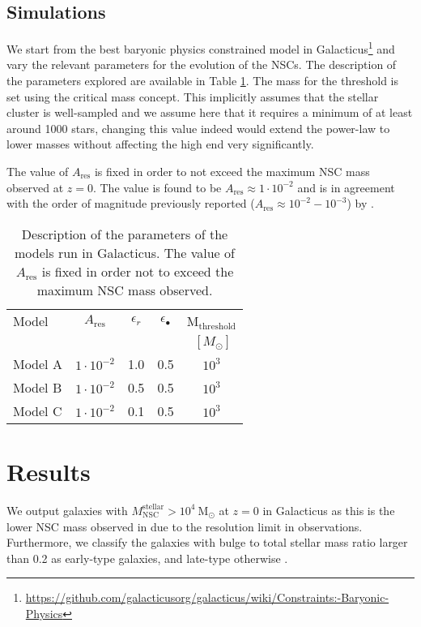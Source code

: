 \documentclass[baaa]{baaa}
\begin{document}
\subsection{Simulations}

We start from the best baryonic physics constrained model in {\sc Galacticus}\footnote{\url{https://github.com/galacticusorg/galacticus/wiki/Constraints:-Baryonic-Physics}} and vary the relevant parameters for the evolution of the NSCs. The description of the parameters explored are available in Table \ref{tabla1}. The mass for the threshold is set using the critical mass concept. This implicitly assumes that the stellar cluster is well-sampled and we assume here that it requires a minimum of at least around 1000 stars, changing this value indeed would extend the power-law to lower masses without affecting the high end very significantly.

The value of $A_\mathrm{res}$ is fixed in order to not exceed the maximum NSC mass observed at $z=0$. The value is found to be $A_\mathrm{res}\approx 1\cdot 10^{-2}$  and is in agreement with the order of magnitude previously reported ($A_\mathrm{res}\approx 10^{-2}-10^{-3}$) by \cite{ANTONINI2015}.


\begin{table}[!t]
\centering
\caption{Description of the parameters of the models run in {\sc Galacticus}. The value of $A_\mathrm{res}$ is fixed in order not to exceed the maximum NSC mass observed. }
\begin{tabular}{lcccc}
\hline\hline\noalign{\smallskip}
\!\!Model & \!\!\!\!$A_\mathrm{res}$ & \!\!\!\! $\epsilon_r$ & \!\!\!\! $\epsilon_\bullet$\!\!\!\! &\!\!\!\!  M$_\mathrm{threshold}$ \\
& & & & $~[M_\odot]$\\
\hline\noalign{\smallskip}
\!\!Model A  & $1\cdot 10^{-2}$ & 1.0 & 0.5& $10^{3}$\\
\!\!Model B & $1\cdot 10^{-2}$  &  0.5& 0.5&$10^{3}$\\
\!\!Model C & $1\cdot 10^{-2}$   &  0.1& 0.5&$10^{3}$\\
\hline
\end{tabular}
\label{tabla1}
\end{table}

\section{Results}

We output galaxies with $M_\mathrm{NSC}^\mathrm{stellar} > 10^{4}~\mathrm{M}_\odot$ at $z=0$ in {\sc Galacticus} as this is the lower NSC mass observed in \cite{COTE2006,GEORGIEV2016,SPENGLER2017} due to the resolution limit in observations. Furthermore, we classify the galaxies with bulge to total stellar mass ratio larger than 0.2 as early-type galaxies, and late-type otherwise \citep{GRAHAM2008}.
\end{document}
